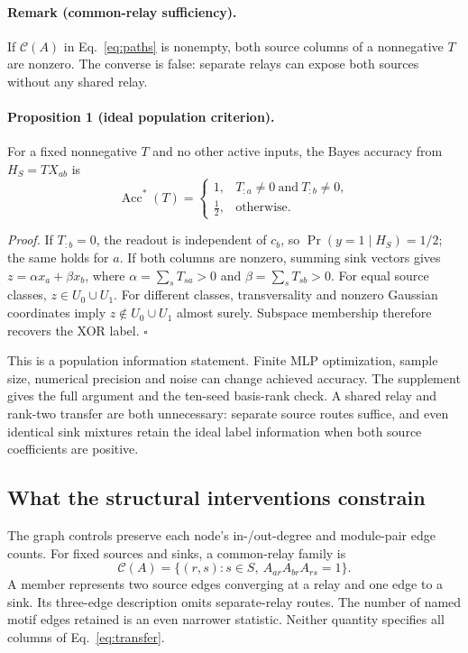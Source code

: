 \paragraph{Remark (common-relay sufficiency).}
If $\mathcal C(A)$ in Eq.~\eqref{eq:paths} is nonempty, both source columns
of a nonnegative $T$ are nonzero. The converse is false: separate relays can
expose both sources without any shared relay.

\paragraph{Proposition 1 (ideal population criterion).}
For a fixed nonnegative $T$ and no other active inputs, the Bayes accuracy
from $H_S=TX_{ab}$ is
\begin{equation}
 \operatorname{Acc}^{*}(T)=
 \begin{cases}
  1, & T_{:a}\ne0\ \text{and}\ T_{:b}\ne0,\\
  \tfrac12, & \text{otherwise}.
 \end{cases}
 \label{eq:criterion}
\end{equation}

\emph{Proof.} If $T_{:b}=0$, the readout is independent of $c_b$,
so $\Pr(y=1\mid H_S)=1/2$; the same holds for $a$.
If both columns are nonzero, summing sink vectors gives
$z=\alpha x_a+\beta x_b$, where
$\alpha=\sum_sT_{sa}>0$ and $\beta=\sum_sT_{sb}>0$.
For equal source classes, $z\in U_0\cup U_1$. For different classes,
transversality and nonzero Gaussian coordinates imply
$z\notin U_0\cup U_1$ almost surely. Subspace membership therefore
recovers the XOR label. $\square$

This is a population information statement. Finite MLP optimization,
sample size, numerical precision and noise can change achieved accuracy.
The supplement gives the full argument and the ten-seed basis-rank check.
A shared relay and rank-two transfer are both unnecessary: separate
source routes suffice, and even identical sink mixtures retain the ideal
label information when both source coefficients are positive.

\subsection{What the structural interventions constrain}
\label{sec:paths}

The graph controls preserve each node's in-/out-degree and module-pair
edge counts. For fixed sources and sinks, a common-relay family is
\begin{equation}
 \mathcal C(A)=\{(r,s):s\in S,\ A_{ar}A_{br}A_{rs}=1\}.
 \label{eq:paths}
\end{equation}
A member represents two source edges converging at a relay and one edge
to a sink. Its three-edge description omits separate-relay routes.
The number of named motif edges retained is an even narrower statistic.
Neither quantity specifies all columns of Eq.~\eqref{eq:transfer}.

